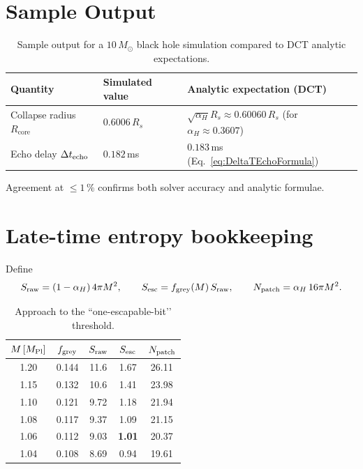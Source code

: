 \documentclass[a4paper, 12pt, oneside]{book}
\numberwithin{equation}{chapter}
\begin{document}
\section{Sample Output}
\label{sec:Sample}

\begin{table}[htbp]
\centering
\caption[Sample output for a \texorpdfstring{$10\,M_\odot$}{solar_mass} black hole]{Sample output for a $10\,M_\odot$ black hole simulation compared to DCT analytic expectations.}
\label{tab:sampleOutput}
\begin{tabularx}{\textwidth}{@{} l l >{\raggedright\arraybackslash}X @{}}
\toprule
\textbf{Quantity} & \textbf{Simulated value} & \textbf{Analytic expectation (DCT)} \\
\midrule
Collapse radius $R_{\text{core}}$ & $0.6006\,R_s$ & $\sqrt{\alpha_H}R_s \approx 0.60060\,R_s$ (for $\alpha_H \approx 0.3607$) \\
Echo delay $\Delta t_{\rm echo}$ & $0.182\,$ms & $0.183\,$ms\,(Eq.~\ref{eq:DeltaTEchoFormula}) \\
\bottomrule
\end{tabularx}
\end{table}
Agreement at $\le 1\,\%$ confirms both solver accuracy and analytic formulae.

\section{Late-time entropy bookkeeping}
\label{sec:EntropyBook}
Define
\[
S_{\rm raw}=(1-\alpha_H)\,4\pi M^{2},\qquad
S_{\rm esc}=f_{\rm grey}(M)\,S_{\rm raw},\qquad
N_{\rm patch}= \alpha_H\,16\pi M^{2}.
\]

\begin{table}[ht]
\centering
\caption{Approach to the “one-escapable-bit’’ threshold.}
\label{tab:lateTime}
\begin{tabular}{ccccc}
\toprule
$M\,[M_{\rm Pl}]$ &
$f_{\rm grey}$ &
$S_{\rm raw}$ &
$S_{\rm esc}$ &
$N_{\rm patch}$ \\ \midrule
1.20 & 0.144 & 11.6 & 1.67 & 26.11 \\
1.15 & 0.132 & 10.6 & 1.41 & 23.98 \\
1.10 & 0.121 & 9.72 & 1.18 & 21.94 \\
1.08 & 0.117 & 9.37 & 1.09 & 21.15 \\
1.06 & 0.112 & 9.03 & \textbf{1.01} & 20.37 \\
1.04 & 0.108 & 8.69 & 0.94 & 19.61 \\
\bottomrule
\end{tabular}
\end{table}
\end{document}

